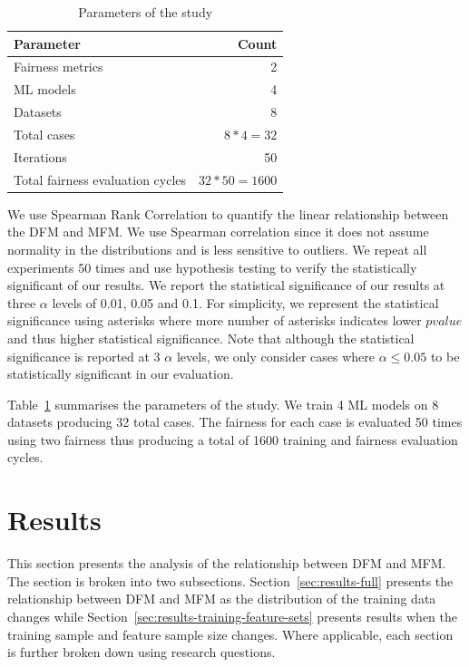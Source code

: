 \documentclass{article}
\begin{document}
\begin{table}
  \centering
  \caption{Parameters of the study}
  \begin{tabular}{lr}
    \toprule
    \textbf{Parameter} & \textbf{Count}\\
    \midrule
    Fairness metrics & 2\\
    ML models & 4\\
    Datasets & 8\\
    Total cases & $8*4=32$\\
    Iterations & 50\\
    Total fairness evaluation cycles & $32*50=1600$\\
    \bottomrule
  \end{tabular}
  \label{tab:parameters}
\end{table}

We use Spearman Rank Correlation to quantify the linear relationship
between the DFM and MFM. We use Spearman correlation since it does not
assume normality in the distributions and is less sensitive to
outliers. We repeat all experiments 50 times and use hypothesis
testing to verify the statistically significant of our results. We
report the statistical significance of our results at three $\alpha$
levels of 0.01, 0.05 and 0.1. For simplicity, we represent the
statistical significance using asterisks where more number of
asterisks indicates lower $pvalue$ and thus higher statistical
significance. Note that although the statistical significance is
reported at 3 $\alpha$ levels, we only consider cases where
$\alpha\le0.05$ to be statistically significant in our evaluation.

Table \ref{tab:parameters} summarises the parameters of the study. We
train 4 ML models on 8 datasets producing 32 total cases. The fairness
for each case is evaluated 50 times using two fairness thus producing
a total of 1600 training and fairness evaluation cycles.

\section{Results}\label{sec:results}

This section presents the analysis of the relationship between DFM and
MFM. The section is broken into two subsections.
Section \ref{sec:results-full} presents the relationship between DFM
and MFM as the distribution of the training data changes while
Section \ref{sec:results-training-feature-sets} presents results when
the training sample and feature sample size changes. Where applicable,
each section is further broken down using research questions.
\end{document}

